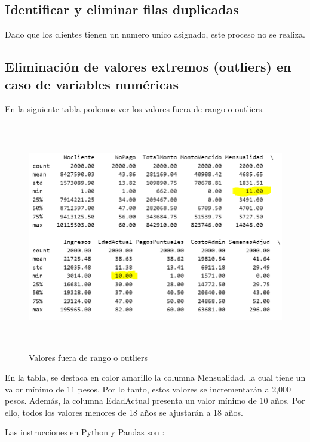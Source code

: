 \subsection{ Identificar y eliminar filas duplicadas}

Dado que los clientes tienen un numero unico asignado, este proceso no se realiza. \medskip
\subsection{ Eliminación de valores extremos (outliers) en caso de variables numéricas}

En la siguiente tabla podemos ver los valores fuera de rango o outliers. \medskip

\begin{figure}[H]
    \centering
       \includegraphics[width=16cm, height=10cm ]{Imagenes/Outliers.PNG }
      \caption{Valores fuera de rango o outliers}
      \label{fig:Outliers}
\end{figure}

En la tabla, se destaca en color amarillo la columna Mensualidad, la cual tiene un valor mínimo 
de 11 pesos. Por lo tanto, estos valores se incrementarán a 2,000 pesos. 
Además, la columna EdadActual presenta un valor mínimo de 10 años. 
Por ello, todos los valores menores de 18 años se ajustarán a 18 años. \medskip

Las instrucciones en Python y Pandas son :

